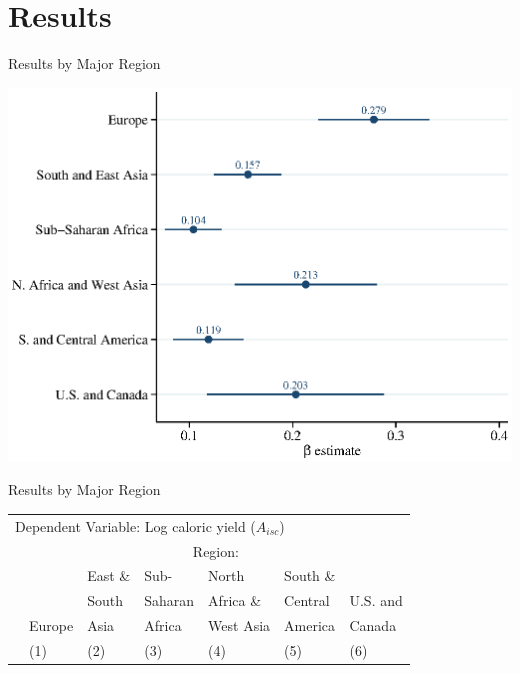 \documentclass[10pt, xcolor=dvipsnames]{beamer}
\begin{document}
\section{Results}

\begin{frame}{Results by Major Region}
\begin{center}
\includegraphics[width=.8\textwidth]{fig_coef_region.eps}
\end{center}
\end{frame}

\begin{frame}{Results by Major Region}

{\scriptsize
\begin{tabularx}{\textwidth}{lXXXXXX}
\midrule
\multicolumn{7}{l}{Dependent Variable: Log caloric yield ($A_{isc}$)} \\
 & \multicolumn{6}{c}{Region:} \\ \cmidrule{2-7}
 &        & East \& & Sub-        & North     & South \&  &  \\
 &        & South   & Saharan     & Africa \& & Central   & U.S. and \\
 & Europe & Asia    & Africa      & West Asia & America   & Canada \\
 & (1) & (2) & (3) & (4) & (5) & (6) \\
\midrule

\midrule
\end{tabularx}
}

\end{frame}
\end{document}
